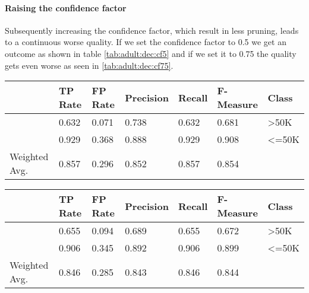 \documentclass[paper=a4, fontsize=11pt]{scrartcl} %
\numberwithin{equation}{section} %
\numberwithin{figure}{section} %
\numberwithin{table}{section} %
\begin{document}
\paragraph{Raising the confidence factor}
Subsequently increasing the confidence factor, which result in less pruning, leads to a continuous worse quality. If we set the confidence factor to 0.5 we get an outcome as shown in table \ref{tab:adult:dec:cf5} and if we set it to 0.75 the quality gets even worse as seen in \ref{tab:adult:dec:cf75}.
\begin{table*}[htb]\centering
    \begin{tabular*}{\columnwidth}{@{}lllllll@{}}
        \toprule 
              &  TP Rate & FP Rate & Precision & Recall & F-Measure & Class    \\  \midrule
              &  0.632   & 0.071   & 0.738     & 0.632  & 0.681     & >50K     \\ 
              &  0.929   & 0.368   & 0.888     & 0.929  & 0.908     & <=50K    \\ 
Weighted Avg. &  0.857   & 0.296   & 0.852     & 0.857  & 0.854     &          \\  \bottomrule
    \end{tabular*}
\caption{Decision Tree -- Confidence Factor of 0.5} 
\label{tab:adult:dec:cf5}
\end{table*}
\FloatBarrier


\begin{table*}[htb]\centering
    \begin{tabular*}{\columnwidth}{@{}lllllll@{}}
        \toprule 
              &  TP Rate & FP Rate & Precision & Recall &  F-Measure &  Class  \\ \midrule        
              &  0.655   & 0.094   & 0.689     & 0.655  &  0.672     &  >50K   \\          
              &  0.906   & 0.345   & 0.892     & 0.906  &  0.899     &  <=50K  \\          
Weighted Avg. &  0.846   & 0.285   & 0.843     & 0.846  &  0.844     &         \\ \bottomrule          
    \end{tabular*}
\caption{Decision Tree -- Confidence Factor of 0.75} 
\label{tab:adult:dec:cf75}
\end{table*}
\FloatBarrier
\end{document}

